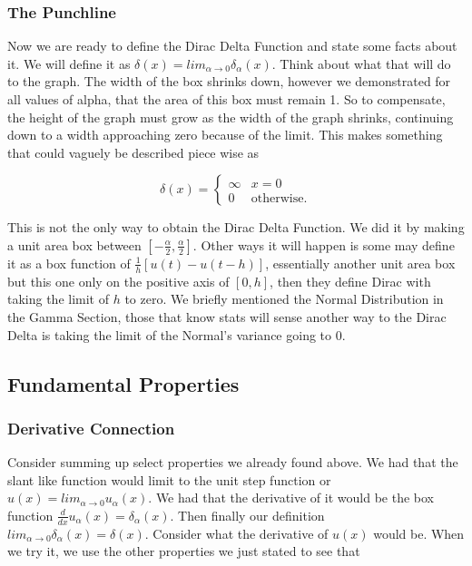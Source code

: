 \documentclass[12pt]{article}
\begin{document}
\subsubsection{The Punchline}

Now we are ready to define the Dirac Delta Function and state some facts about it. We will define it as $\delta(x)=lim_{\alpha\rightarrow0} \delta_{\alpha}(x)$. Think about what that will do to the graph. The width of the box shrinks down, however we demonstrated for all values of alpha, that the area of this box must remain 1. So to compensate, the height of the graph must grow as the width of the graph shrinks, continuing down to a width approaching zero because of the limit. This makes something that could vaguely be described piece wise as

\begin{equation*}
    \delta(x)=\left\{
        \begin{array}{cc}
            \infty &  x=0  \\
            0 & \text{otherwise}.
        \end{array}
    \right.
\end{equation*}

This is not the only way to obtain the Dirac Delta Function. We did it by making a unit area box between $\left[-\frac{\alpha}{2},\frac{\alpha}{2} \right]$. Other ways it will happen is some may define it as a box function of $\frac{1}{h}[u(t)-u(t-h)]$, essentially another unit area box but this one only on the positive axis of $[0,h]$, then they define Dirac with taking the limit of $h$ to zero. We briefly mentioned the Normal Distribution in the Gamma Section, those that know stats will sense another way to the Dirac Delta is taking the limit of the Normal's variance going to 0.

\subsection{Fundamental Properties}

\subsubsection{Derivative Connection}

Consider summing up select properties we already found above. We had that the slant like function would limit to the unit step function or $u(x)=lim_{\alpha\rightarrow0} u_{\alpha}(x)$. We had that the derivative of it would be the box function $\frac{d}{dx}u_{\alpha}(x)=\delta_{\alpha}(x)$. Then finally our definition $lim_{\alpha\rightarrow0} \delta_{\alpha}(x)=\delta(x)$. Consider what the derivative of $u(x)$ would be. When we try it, we use the other properties we just stated to see that 
\end{document}
